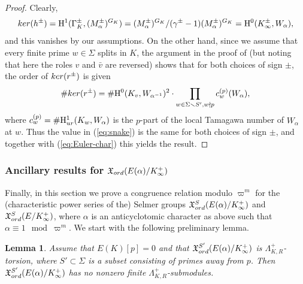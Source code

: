 \documentclass[a4paper,10pt]{amsart}
\numberwithin{equation}{section}
\numberwithin{equation}{section}
\theoremstyle{plain}
\theoremstyle{definition}
\theoremstyle{definition}
\theoremstyle{plain}
\theoremstyle{plain}
\newtheorem{lemma}[thm]{Lemma}
\theoremstyle{plain}
\theoremstyle{plain}
\newcommand{\X}{\mathfrak{X}}
\newcommand{\Fcal}{\mathcal{F}}
\newcommand{\rH}{\mathrm{H}}
\begin{document}
\begin{proof}
Clearly, 
\[
{\rm ker}(h^\pm)=\rH^1(\Gamma_K^\pm,(M_\alpha^\pm)^{G_K})=(M_\alpha^\pm)^{G_K}/(\gamma^\pm-1)(M_\alpha^\pm)^{G_K}=\rH^0(K_\infty^\pm,W_\alpha),
\]
and this vanishes by our assumptions. On the other hand, since we assume that every finite prime $w\in\Sigma$ splits in $K$, the argument in the proof of \cite[Prop.\,3.3.7]{jsw} (but noting that here the roles $v$ and $\bar{v}$ are reversed) shows that for both choices of sign $\pm$, the order of ${\rm ker}(r^\pm)$ is given 
\[
\#{\rm ker}(r^\pm)=\#\rH^0(K_v,W_{\alpha^{-1}})^2\cdot\prod_{w\in\Sigma\smallsetminus S',w\nmid p}c_w^{(p)}(W_\alpha),
\]
where $c_w^{(p)}=\#\rH^1_{\rm ur}(K_w,W_\alpha)$ is the $p$-part of the local Tamagawa number of $W_\alpha$ at $w$. Thus the value in (\ref{eq:snake}) is the same for both choices of sign $\pm$, and together with (\ref{eq:Euler-char}) this yields the result.
%
\end{proof}



\subsubsection{Ancillary results for $\X_{\rm ord}(E(\alpha)/K_\infty^+)$}
Finally, in this section we prove a congruence relation modulo $\varpi^m$ for the (characteristic power series of the) Selmer groups $\X_{\rm ord}^S(E(\alpha)/K_\infty^+)$ and $\X_{\rm ord}^S(E/K_\infty^+)$, where $\alpha$ is an anticyclotomic character as above such that $\alpha\equiv 1\mod\varpi^m$. We start with the following preliminary lemma. 


\begin{lemma}\label{lem:almost-div-ord}
Assume that $E(K)[p]=0$ and that $\X_{\rm ord}^{S'}(E(\alpha)/K_\infty^+)$ is $\Lambda_{K,R}^+$-torsion, where $S'\subset\Sigma$ is a subset consisting of primes away from $p$. Then $\X_{\rm ord}^{S'}(E(\alpha)/K_\infty^+)$ has no nonzero finite $\Lambda_{K,R}^+$-submodules.
\end{lemma}
\end{document}
